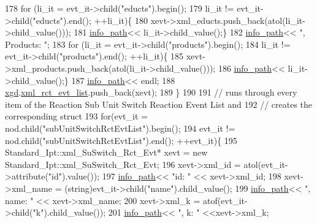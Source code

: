 \begin{DoxyCode}
178         \textcolor{keywordflow}{for} (li\_it = evt\_it->child(\textcolor{stringliteral}{"educts"}).begin();
179                 li\_it != evt\_it->child(\textcolor{stringliteral}{"educts"}).end(); ++li\_it)\{
180             xevt->xml\_educts.push\_back(atol(li\_it->child\_value()));
181             \hyperlink{classnw_1_1_standard___ipt_a7b8147e8b90f4adabb30e1b3fd8c40b8}{info\_path}<< li\_it->child\_value();\}
182         \hyperlink{classnw_1_1_standard___ipt_a7b8147e8b90f4adabb30e1b3fd8c40b8}{info\_path}<< \textcolor{stringliteral}{", Products: "};
183         \textcolor{keywordflow}{for} (li\_it = evt\_it->child(\textcolor{stringliteral}{"products"}).begin();
184                 li\_it != evt\_it->child(\textcolor{stringliteral}{"products"}).end(); ++li\_it)\{
185             xevt->xml\_products.push\_back(atol(li\_it->child\_value()));
186             \hyperlink{classnw_1_1_standard___ipt_a7b8147e8b90f4adabb30e1b3fd8c40b8}{info\_path}<< li\_it->child\_value();\}
187         \hyperlink{classnw_1_1_standard___ipt_a7b8147e8b90f4adabb30e1b3fd8c40b8}{info\_path}<< endl;
188         \hyperlink{classnw_1_1_standard___ipt_aad5708d9729b7a5f660dade1927b4d4e}{xgd}.\hyperlink{structnw_1_1_standard___ipt_1_1xml__gen__data_abc4e7ae5a154343c1d3d25917bd58a5f}{xml\_rct\_evt\_list}.push\_back(xevt);
189     \}
190 
191 \textcolor{comment}{//  runs through every item of the Reaction Sub Unit Switch Reaction Event List and}
192 \textcolor{comment}{//  creates the corresponding struct}
193     \textcolor{keywordflow}{for}(evt\_it = nod.child(\textcolor{stringliteral}{"subUnitSwitchRctEvtList"}).begin();
194             evt\_it != nod.child(\textcolor{stringliteral}{"subUnitSwitchRctEvtList"}).end(); ++evt\_it)\{
195         Standard\_Ipt::xml\_SuSwitch\_Rct\_Evt* xevt = \textcolor{keyword}{new} Standard\_Ipt::xml\_SuSwitch\_Rct\_Evt;
196         xevt->xml\_id = atol(evt\_it->attribute(\textcolor{stringliteral}{"id"}).value());
197         \hyperlink{classnw_1_1_standard___ipt_a7b8147e8b90f4adabb30e1b3fd8c40b8}{info\_path}<< \textcolor{stringliteral}{"id: "} << xevt->xml\_id;
198         xevt->xml\_name = (string)evt\_it->child(\textcolor{stringliteral}{"name"}).child\_value();
199         \hyperlink{classnw_1_1_standard___ipt_a7b8147e8b90f4adabb30e1b3fd8c40b8}{info\_path}<< \textcolor{stringliteral}{", name: "} << xevt->xml\_name;
200         xevt->xml\_k = atof(evt\_it->child(\textcolor{stringliteral}{"k"}).child\_value());
201         \hyperlink{classnw_1_1_standard___ipt_a7b8147e8b90f4adabb30e1b3fd8c40b8}{info\_path}<< \textcolor{stringliteral}{", k: "} <<xevt->xml\_k;

\end{DoxyCode}
